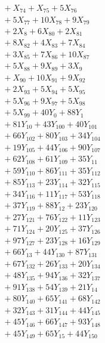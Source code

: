 \documentclass[a4paper,10pt]{article}
\begin{document}
{\begin{align}
&\quad  + X_{74} + X_{75} + 5X_{76} \\[0.5ex]
&\quad  + 5X_{77} + 10X_{78} + 9X_{79} \\[0.5ex]
&\quad  + 2X_{8} + 6X_{80} + 2X_{81} \\[0.5ex]
&\quad  + 8X_{82} + 4X_{83} + 7X_{84} \\[0.5ex]
&\quad  + 3X_{85} + 7X_{86} + 10X_{87} \\[0.5ex]
&\quad  + 5X_{88} + 9X_{89} + 3X_{9} \\[0.5ex]
&\quad  + X_{90} + 10X_{91} + 9X_{92} \\[0.5ex]
&\quad  + 2X_{93} + 5X_{94} + 5X_{95} \\[0.5ex]
&\quad  + 5X_{96} + 9X_{97} + 5X_{98} \\[0.5ex]
&\quad  + 5X_{99} + 40Y_{0} + 88Y_{1} \\[0.5ex]
&\quad  + 81Y_{10} + 43Y_{100} + 40Y_{101} \\[0.5ex]
&\quad  + 66Y_{102} + 80Y_{103} + 34Y_{104} \\[0.5ex]
&\quad  + 19Y_{105} + 44Y_{106} + 90Y_{107} \\[0.5ex]
&\quad  + 62Y_{108} + 61Y_{109} + 35Y_{11} \\[0.5ex]
&\quad  + 59Y_{110} + 86Y_{111} + 35Y_{112} \\[0.5ex]
&\quad  + 85Y_{113} + 23Y_{114} + 32Y_{115} \\[0.5ex]
&\quad  + 34Y_{116} + 11Y_{117} + 53Y_{118} \\[0.5ex]
&\quad  + 37Y_{119} + 88Y_{12} + 23Y_{120} \\[0.5ex]
&\quad  + 27Y_{121} + 76Y_{122} + 11Y_{123} \\[0.5ex]
&\quad  + 71Y_{124} + 20Y_{125} + 37Y_{126} \\[0.5ex]
&\quad  + 97Y_{127} + 23Y_{128} + 16Y_{129} \\[0.5ex]
&\quad  + 66Y_{13} + 44Y_{130} + 87Y_{131} \\[0.5ex]
&\quad  + 67Y_{132} + 26Y_{133} + 20Y_{134} \\[0.5ex]
&\quad  + 48Y_{135} + 94Y_{136} + 32Y_{137} \\[0.5ex]
&\quad  + 91Y_{138} + 54Y_{139} + 21Y_{14} \\[0.5ex]
&\quad  + 80Y_{140} + 65Y_{141} + 68Y_{142} \\[0.5ex]
&\quad  + 32Y_{143} + 31Y_{144} + 44Y_{145} \\[0.5ex]
&\quad  + 45Y_{146} + 66Y_{147} + 93Y_{148} \\[0.5ex]
&\quad  + 45Y_{149} + 65Y_{15} + 44Y_{150} \\[0.5ex]

\end{align}}
\end{document}
